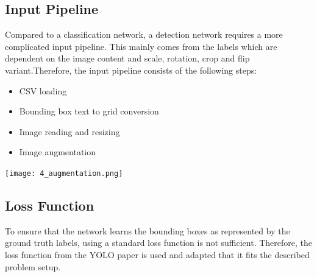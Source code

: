 \documentclass[landscape,a2,final,12pt]{issposter}
\begin{document}
\begin{multicols}{3}
    \begin{samepage}
    \section{Input Pipeline}
        
            \begin{small}Compared to a classification network, a detection network requires a more complicated input pipeline. This mainly comes from the 
            labels which are dependent on the image content and scale, rotation, crop and flip variant.Therefore, the input pipeline consists of the following steps:
            \begin{itemize}
                \item CSV loading
                \item Bounding box text to grid conversion
                \item Image reading and resizing
                \item Image augmentation
            \end{itemize}
            \begin{minipage}[t]{0.3\textwidth}
                \begin{center}
                    \texttt{[image: 4\_augmentation.png]}
                \end{center}
            \end{minipage}
            \end{small}
            \vspace*{5cm}
    \end{samepage}
    \columnbreak
    \begin{samepage}
    \section{Loss Function}
    \begin{minipage}[t]{0.3\textwidth}
            \begin{small} To ensure that the network learns the bounding boxes as represented by the ground truth labels, 
            using a standard loss function is not sufficient. Therefore, the loss function from the YOLO paper is used and adapted 
            that it fits the described problem setup.
            

\end{small}
\end{minipage}
\end{samepage}
\end{multicols}
\end{document}
